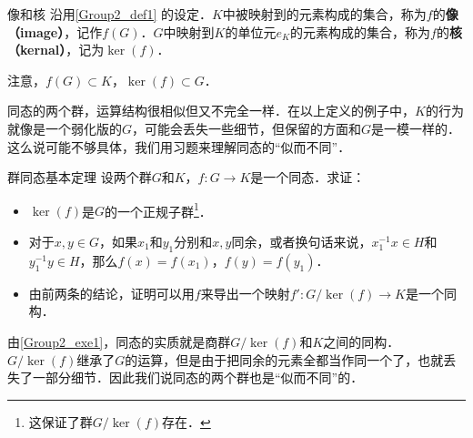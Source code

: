 \begin{definition}{像和核}
沿用\autoref{Group2_def1} 的设定．$K$中被映射到的元素构成的集合，称为$f$的\textbf{像（image）}，记作$f(G)$．$G$中映射到$K$的单位元$e_K$的元素构成的集合，称为$f$的\textbf{核（kernal）}，记为$\ker(f)$．
\end{definition}

注意，$f(G)\subset K$，$\ker(f)\subset G$．

同态的两个群，运算结构很相似但又不完全一样．在以上定义的例子中，$K$的行为就像是一个弱化版的$G$，可能会丢失一些细节，但保留的方面和$G$是一模一样的．这么说可能不够具体，我们用习题来理解同态的“似而不同”．

\begin{exercise}{群同态基本定理}\label{Group2_exe1}
设两个群$G$和$K$，$f:G\rightarrow K$是一个同态．求证：
\begin{itemize}
\item $\ker(f)$是$G$的一个正规子群\footnote{这保证了群$G/\ker(f)$存在．}．
\item 对于$x, y\in G$，如果$x_1$和$y_1$分别和$x, y$同余，或者换句话来说，$x_1^{-1}x\in H$和$y_1^{-1}y\in H$，那么$f(x)=f(x_1)$，$f(y)=f(y_1)$．
\item 由前两条的结论，证明可以用$f$来导出一个映射$f': G/\ker(f)\rightarrow K$是一个同构．

\end{itemize}
\end{exercise}

由\autoref{Group2_exe1}，同态的实质就是商群$G/\ker(f)$和$K$之间的同构．$G/\ker(f)$继承了$G$的运算，但是由于把同余的元素全都当作同一个了，也就丢失了一部分细节．因此我们说同态的两个群也是“似而不同”的．


